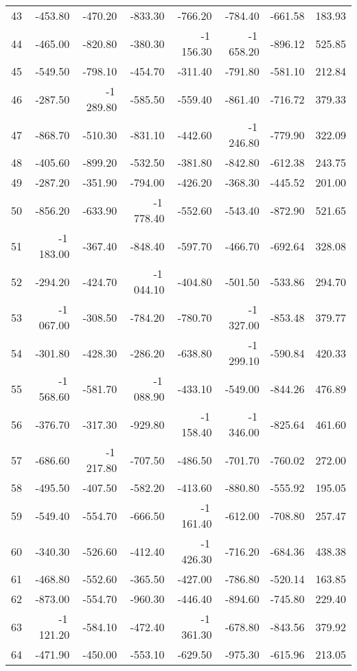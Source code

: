 \begin{longtable}{rrrrrrrr}
43 & -453.80 & -470.20 & -833.30 & -766.20 & -784.40 & -661.58 & 183.93  \\
44 & -465.00 & -820.80 & -380.30 & -1\,156.30 & -1\,658.20 & -896.12 & 525.85  \\
45 & -549.50 & -798.10 & -454.70 & -311.40 & -791.80 & -581.10 & 212.84  \\
46 & -287.50 & -1\,289.80 & -585.50 & -559.40 & -861.40 & -716.72 & 379.33  \\
47 & -868.70 & -510.30 & -831.10 & -442.60 & -1\,246.80 & -779.90 & 322.09  \\
48 & -405.60 & -899.20 & -532.50 & -381.80 & -842.80 & -612.38 & 243.75  \\
49 & -287.20 & -351.90 & -794.00 & -426.20 & -368.30 & -445.52 & 201.00  \\
50 & -856.20 & -633.90 & -1\,778.40 & -552.60 & -543.40 & -872.90 & 521.65  \\
51 & -1\,183.00 & -367.40 & -848.40 & -597.70 & -466.70 & -692.64 & 328.08  \\
52 & -294.20 & -424.70 & -1\,044.10 & -404.80 & -501.50 & -533.86 & 294.70  \\
53 & -1\,067.00 & -308.50 & -784.20 & -780.70 & -1\,327.00 & -853.48 & 379.77  \\
54 & -301.80 & -428.30 & -286.20 & -638.80 & -1\,299.10 & -590.84 & 420.33  \\
55 & -1\,568.60 & -581.70 & -1\,088.90 & -433.10 & -549.00 & -844.26 & 476.89  \\
56 & -376.70 & -317.30 & -929.80 & -1\,158.40 & -1\,346.00 & -825.64 & 461.60  \\
57 & -686.60 & -1\,217.80 & -707.50 & -486.50 & -701.70 & -760.02 & 272.00  \\
58 & -495.50 & -407.50 & -582.20 & -413.60 & -880.80 & -555.92 & 195.05  \\
59 & -549.40 & -554.70 & -666.50 & -1\,161.40 & -612.00 & -708.80 & 257.47  \\
60 & -340.30 & -526.60 & -412.40 & -1\,426.30 & -716.20 & -684.36 & 438.38  \\
61 & -468.80 & -552.60 & -365.50 & -427.00 & -786.80 & -520.14 & 163.85  \\
62 & -873.00 & -554.70 & -960.30 & -446.40 & -894.60 & -745.80 & 229.40  \\
63 & -1\,121.20 & -584.10 & -472.40 & -1\,361.30 & -678.80 & -843.56 & 379.92  \\
64 & -471.90 & -450.00 & -553.10 & -629.50 & -975.30 & -615.96 & 213.05  \\

\end{longtable}
